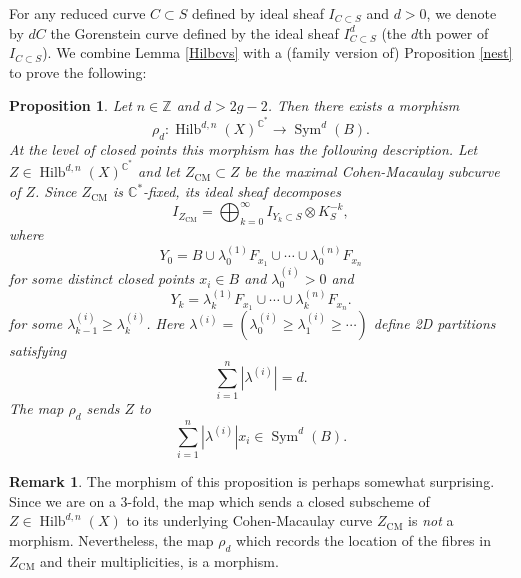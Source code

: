 \documentclass{amsart}
\newtheorem{proposition}[theorem]{Proposition}
\theoremstyle{definition}
\newtheorem{remark}[theorem]{Remark}
\newcommand{\CC} {\mathbb{C}}          %
\newcommand{\ZZ} {\mathbb{Z}}		%
\newcommand{\Sym}{\operatorname{Sym}}
\newcommand{\Hilb}{\operatorname{Hilb}}
\newcommand{\CM}{\operatorname{CM}}
\begin{document}
For any reduced curve $C \subset S$ defined by ideal sheaf $I_{C \subset S}$ and $d >0$, we denote by $dC$ the Gorenstein curve defined by the ideal sheaf $I_{C \subset S}^d$ (the $d$th power of $I_{C \subset S}$). We combine Lemma \ref{Hilbcvs} with a (family version of) Proposition \ref{nest} to prove the following:
\begin{proposition} \label{proprho}
Let $n \in \ZZ$ and $d > 2g-2$. Then there exists a morphism
$$
\rho_d : \Hilb^{d,n}(X)^{\CC^*} \longrightarrow \Sym^d(B). 
$$
At the level of closed points this morphism has the following description. Let $Z \in \Hilb^{d,n}(X)^{\CC^*}$ and let $Z_{\CM} \subset Z$ be the maximal Cohen-Macaulay subcurve of $Z$. Since $Z_{\CM}$ is $\CC^*$-fixed, its ideal sheaf decomposes
$$
I_{Z_{\CM}} = \bigoplus_{k=0}^{\infty} I_{Y_k \subset S} \otimes K_{S}^{-k},
$$
where 
$$
Y_0 = B \cup \lambda_{0}^{(1)} F_{x_1} \cup \cdots \cup \lambda_{0}^{(n)} F_{x_n}
$$
for some distinct closed points $x_i \in B$ and $\lambda_{0}^{(i)} > 0$ and
$$
Y_k = \lambda_{k}^{(1)} F_{x_1} \cup \cdots \cup \lambda_{k}^{(n)} F_{x_n}.
$$
for some $\lambda_{k-1}^{(i)} \geq \lambda_{k}^{(i)}$. Here $\lambda^{(i)} = (\lambda^{(i)}_{0} \geq \lambda^{(i)}_{1} \geq \cdots)$ define 2D partitions satisfying 
$$
\sum_{i=1}^{n} |\lambda^{(i)}| = d.
$$
The map $\rho_d$ sends $Z$ to 
$$
\sum_{i=1}^{n} |\lambda^{(i)}| x_i \in \Sym^d(B).
$$
\end{proposition}

\begin{remark}
The morphism of this proposition is perhaps somewhat surprising. Since we are on a 3-fold, the map which sends a closed subscheme of $Z \in \Hilb^{d,n}(X)$ to its underlying Cohen-Macaulay curve $Z_{\CM}$ is \emph{not} a morphism. Nevertheless, the map $\rho_d$ which records the location of the fibres in $Z_{\CM}$ and their multiplicities, is a morphism.
\end{remark}
\end{document}
